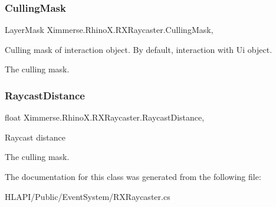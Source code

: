 \subsubsection{\texorpdfstring{Culling\+Mask}{CullingMask}}
{\footnotesize\ttfamily Layer\+Mask Ximmerse.\+Rhino\+X.\+R\+X\+Raycaster.\+Culling\+Mask\hspace{0.3cm}{\ttfamily [get]}, {\ttfamily [set]}}



Culling mask of interaction object. By default, interaction with Ui object. 

The culling mask.\mbox{\label{class_ximmerse_1_1_rhino_x_1_1_r_x_raycaster_a122146e73455860e6aaf030211fe948c}} 
\subsubsection{\texorpdfstring{Raycast\+Distance}{RaycastDistance}}
{\footnotesize\ttfamily float Ximmerse.\+Rhino\+X.\+R\+X\+Raycaster.\+Raycast\+Distance\hspace{0.3cm}{\ttfamily [get]}, {\ttfamily [set]}}



Raycast distance 

The culling mask.

The documentation for this class was generated from the following file\+:\begin{DoxyCompactItemize}
\item 
H\+L\+A\+P\+I/\+Public/\+Event\+System/R\+X\+Raycaster.\+cs\end{DoxyCompactItemize}
